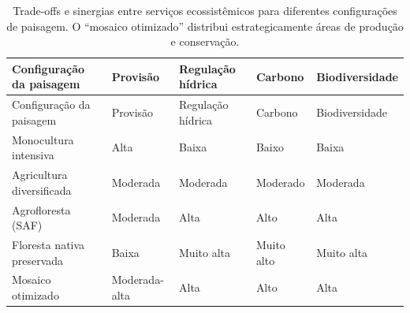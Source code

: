\documentclass[
  portuguese,
  11pt,
  a4paper,
  open=any]{scrbook}
\begin{document}
\begin{longtable}[]{@{}
  >{\raggedright\arraybackslash}p{}
  >{\centering\arraybackslash}p{}
  >{\centering\arraybackslash}p{}
  >{\centering\arraybackslash}p{}
  >{\centering\arraybackslash}p{}@{}}
\caption{Trade-offs e sinergias entre serviços ecossistêmicos para
diferentes configurações de paisagem. O ``mosaico otimizado'' distribui
estrategicamente áreas de produção e
conservação.}\label{tbl-tradeoffs}\tabularnewline
\toprule\noalign{}
\begin{minipage}[b]{\linewidth}\raggedright
Configuração da paisagem
\end{minipage} & \begin{minipage}[b]{\linewidth}\centering
Provisão
\end{minipage} & \begin{minipage}[b]{\linewidth}\centering
Regulação hídrica
\end{minipage} & \begin{minipage}[b]{\linewidth}\centering
Carbono
\end{minipage} & \begin{minipage}[b]{\linewidth}\centering
Biodiversidade
\end{minipage} \\
\midrule\noalign{}
\endfirsthead
\toprule\noalign{}
\begin{minipage}[b]{\linewidth}\raggedright
Configuração da paisagem
\end{minipage} & \begin{minipage}[b]{\linewidth}\centering
Provisão
\end{minipage} & \begin{minipage}[b]{\linewidth}\centering
Regulação hídrica
\end{minipage} & \begin{minipage}[b]{\linewidth}\centering
Carbono
\end{minipage} & \begin{minipage}[b]{\linewidth}\centering
Biodiversidade
\end{minipage} \\
\midrule\noalign{}
\endhead
\bottomrule\noalign{}
\endlastfoot
Monocultura intensiva & Alta & Baixa & Baixo & Baixa \\
Agricultura diversificada & Moderada & Moderada & Moderado & Moderada \\
Agrofloresta (SAF) & Moderada & Alta & Alto & Alta \\
Floresta nativa preservada & Baixa & Muito alta & Muito alto & Muito
alta \\
Mosaico otimizado & Moderada-alta & Alta & Alto & Alta \\
\end{longtable}
\end{document}
